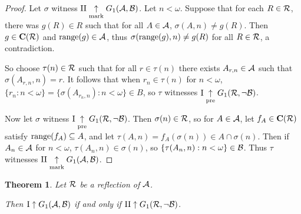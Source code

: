 \documentclass{amsart}
\theoremstyle{plain}
\newtheorem{theorem}{Theorem}
\theoremstyle{definition}
\theoremstyle{remark}
\theoremstyle{plain}
\theoremstyle{definition}
\theoremstyle{remark}
\begin{document}
\begin{proof}
  Let \(\sigma\) witness 
  \(\mathrm{II}\underset{\text{mark}}{\uparrow}G_{1}(\mathcal{A},\mathcal{B})\).
  Let \(n<\omega\). Suppose that for each \(R\in\mathcal{R}\),
  there was \(g(R)\in R\) such that for all \(A\in \mathcal{A}\),
  \(\sigma(A,n)\not=g(R)\). Then \(g\in\mathbf C(\mathcal{R})\)
  and \(\text{range}(g)\in\mathcal{A}\),
  thus \(\sigma(\text{range}(g),n)\not=g(R)\) for all \(R\in\mathcal{R}\),
  a contradiction.

  So choose \(\tau(n)\in\mathcal{R}\) such that for all \(r\in \tau(n)\)
  there exists \(A_{r,n}\in\mathcal{A}\) such that \(\sigma(A_{r,n},n)=r\).
  It follows that when \(r_n\in\tau(n)\) for \(n<\omega\),
  \(\{r_n:n<\omega\}=\{\sigma(A_{r_n,n}):n<\omega\}\in B\),
  so \(\tau\) witnesses
  \(\mathrm{I}\underset{\text{pre}}{\uparrow}G_{1}(\mathcal{R},\neg\mathcal{B})\).

  Now let \(\sigma\) witness 
  \(\mathrm{I}\underset{\text{pre}}{\uparrow}G_{1}(\mathcal{R},\neg\mathcal{B})\).
  Then \(\sigma(n)\in\mathcal{R}\), so for \(A\in\mathcal{A}\), let
  \(f_A\in\mathbf C(\mathcal{R})\) satisfy \(\text{range}(f_A)\subseteq A\),
  and let \(\tau(A,n)=f_A(\sigma(n))\in A\cap\sigma(n)\).
  Then if \(A_n\in\mathcal{A}\) for \(n<\omega\), \(\tau(A_n,n)\in\sigma(n)\),
  so \(\{\tau(A_n,n):n<\omega\}\in\mathcal{B}\).
  Thus \(\tau\) witnesses
  \(\mathrm{II}\underset{\text{mark}}{\uparrow}G_{1}(\mathcal{A},\mathcal{B})\).
\end{proof}

\begin{theorem}
  Let \(\mathcal{R}\) be a reflection of \(\mathcal{A}\). 

  Then
  \(\mathrm{I}\uparrow G_{1}(\mathcal{A},\mathcal{B})\) if and only if
  \(\mathrm{II}\uparrow G_{1}(\mathcal{R},\neg\mathcal{B})\).
\end{theorem}
\end{document}
